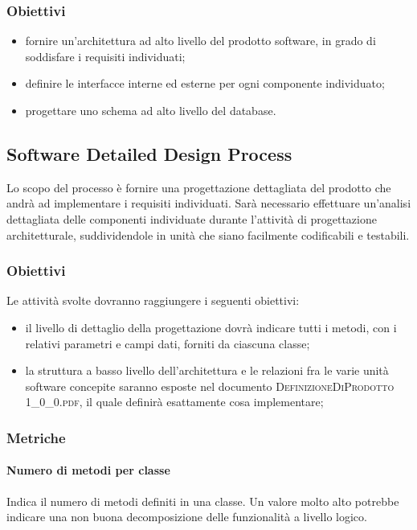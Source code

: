 		\subsubsection{Obiettivi}
			\begin{itemize}
				\item fornire un'architettura ad alto livello del prodotto software, in grado di soddisfare i requisiti individuati;
				\item definire le interfacce interne ed esterne per ogni componente individuato;
				\item progettare uno schema ad alto livello del database. 
			\end{itemize}
	
	\subsection{Software Detailed Design Process}
	Lo scopo del processo è fornire una progettazione dettagliata del prodotto che andrà ad implementare i requisiti individuati.
	Sarà necessario effettuare un’analisi dettagliata delle componenti individuate durante l'attività di progettazione
	architetturale, suddividendole in unità che siano facilmente codificabili e testabili.
		
		\subsubsection{Obiettivi}
		Le attività svolte dovranno raggiungere i seguenti obiettivi:
		\begin{itemize}
			\item il livello di dettaglio della progettazione dovrà indicare tutti i metodi, con i relativi parametri e campi dati, forniti da ciascuna classe;
			\item la struttura a basso livello dell’architettura e le relazioni fra le varie unità software concepite saranno esposte nel documento \textsc{DefinizioneDiProdotto 1\_0\_0.pdf}, il quale definirà esattamente cosa implementare;
		\end{itemize}
		
		\subsubsection{Metriche}
			
			\paragraph{Numero di metodi per classe}
			Indica il numero di metodi definiti in una classe.
			Un valore molto alto potrebbe indicare una
			non buona decomposizione delle funzionalità a livello logico.
			
